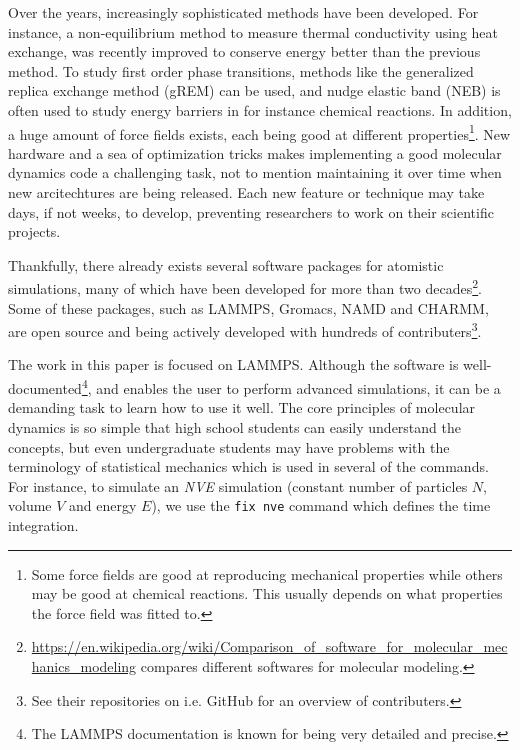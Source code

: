 \documentclass[aps,pre,twocolumn,letterpaper,floatfix,nofootinbib]{revtex4}
\newcommand{\code}[1]{\colorbox{light-gray}{\color{RawSienna}\texttt{#1}}}
\begin{document}
Over the years, increasingly sophisticated methods have been developed.
For instance, a non-equilibrium method to measure thermal conductivity using heat exchange, was recently improved\citep{wirnsberger2015enhanced} to conserve energy better than the previous method\citep{ikeshoji1994non}.
To study first order phase transitions, methods like the generalized replica exchange method (gREM)\citep{kim2010generalized} can be used, and nudge elastic band (NEB)\citep{henkelman2000climbing, henkelman2000improved} is often used to study energy barriers in for instance chemical reactions.
In addition, a huge amount of force fields exists, each being good at different properties\footnote{Some force fields are good at reproducing mechanical properties while others may be good at chemical reactions. This usually depends on what properties the force field was fitted to.}.
New hardware and a sea of optimization tricks makes implementing a good molecular dynamics code a challenging task, not to mention maintaining it over time when new arcitechtures are being released.
Each new feature or technique may take days, if not weeks, to develop, preventing researchers to work on their scientific projects.

Thankfully, there already exists several software packages for atomistic simulations, many of which have been developed for more than two decades\footnote{\url{https://en.wikipedia.org/wiki/Comparison_of_software_for_molecular_mechanics_modeling} compares different softwares for molecular modeling.}.
Some of these packages, such as LAMMPS\citep{Plimpton1995Fast}, Gromacs\citep{berendsen1995gromacs}, NAMD\citep{Phillips2005Scalable} and CHARMM\citep{brooks2009charmm}, are open source and being actively developed with hundreds of contributers\footnote{See their repositories on i.e. GitHub for an overview of contributers.}.



The work in this paper is focused on LAMMPS.
Although the software is well-documented\footnote{The LAMMPS documentation is known for being very detailed and precise.}, and enables the user to perform advanced simulations, it can be a demanding task to learn how to use it well.
The core principles of molecular dynamics is so simple that high school students can easily understand the concepts, but even undergraduate students may have problems with the terminology of statistical mechanics which is used in several of the commands.
For instance, to simulate an \textit{NVE} simulation (constant number of particles $N$, volume $V$ and energy $E$), we use the \code{fix nve} command which defines the time integration.
\end{document}
